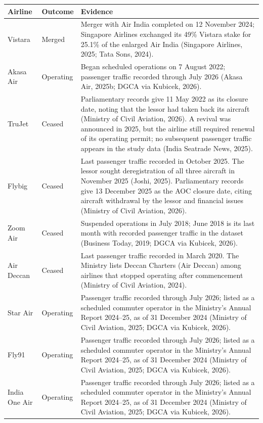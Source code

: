 \documentclass[12pt,a4paper]{article}
\newenvironment{o3box}{\ifthenelse{\boolean{o3highlight}}{\begingroup\color{o3sky}}{}}{\ifthenelse{\boolean{o3highlight}}{\endgroup}{}}
\begin{document}
\begin{o3box}
\begin{minipage}{\textwidth}
\end{minipage}\par\medskip


\begingroup
\footnotesize
{}
\label{tab:o3-outcomes}
\noindent\begin{tabularx}{\textwidth}{|>{\raggedright\arraybackslash}p{}|>{\raggedright\arraybackslash}p{}|>{\raggedright\arraybackslash}X|}
\hline
\textbf{Airline} & \textbf{Outcome} & \textbf{Evidence} \\
\hline
Vistara & Merged & Merger with Air India completed on 12 November 2024; Singapore Airlines exchanged its 49\% Vistara stake for 25.1\% of the enlarged Air India (Singapore Airlines, 2025; Tata Sons, 2024). \\
\hline
Akasa Air & Operating & Began scheduled operations on 7 August 2022; passenger traffic recorded through July 2026 (Akasa Air, 2025b; DGCA via Kubicek, 2026). \\
\hline
TruJet & Ceased & Parliamentary records give 11 May 2022 as its closure date, noting that the lessor had taken back its aircraft (Ministry of Civil Aviation, 2026). A revival was announced in 2025, but the airline still required renewal of its operating permit; no subsequent passenger traffic appears in the study data (India Seatrade News, 2025). \\
\hline
Flybig & Ceased & Last passenger traffic recorded in October 2025. The lessor sought deregistration of all three aircraft in November 2025 (Joshi, 2025). Parliamentary records give 13 December 2025 as the AOC closure date, citing aircraft withdrawal by the lessor and financial issues (Ministry of Civil Aviation, 2026). \\
\hline
Zoom Air & Ceased & Suspended operations in July 2018; June 2018 is its last month with recorded passenger traffic in the dataset (Business Today, 2019; DGCA via Kubicek, 2026). \\
\hline
Air Deccan & Ceased & Last passenger traffic recorded in March 2020. The Ministry lists Deccan Charters (Air Deccan) among airlines that stopped operating after commencement (Ministry of Civil Aviation, 2024). \\
\hline
Star Air & Operating & Passenger traffic recorded through July 2026; listed as a scheduled commuter operator in the Ministry's Annual Report 2024--25, as of 31 December 2024 (Ministry of Civil Aviation, 2025; DGCA via Kubicek, 2026). \\
\hline
Fly91 & Operating & Passenger traffic recorded through July 2026; listed as a scheduled commuter operator in the Ministry's Annual Report 2024--25, as of 31 December 2024 (Ministry of Civil Aviation, 2025; DGCA via Kubicek, 2026). \\
\hline
India One Air & Operating & Passenger traffic recorded through July 2026; listed as a scheduled commuter operator in the Ministry's Annual Report 2024--25, as of 31 December 2024 (Ministry of Civil Aviation, 2025; DGCA via Kubicek, 2026). \\
\hline
\end{tabularx}
\endgroup



\end{o3box}
\end{document}
